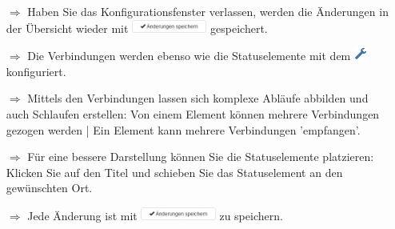 \documentclass{article}
\begin{document}
\begin{multicols}{2}

\begin{tcolorbox}[colback=blue!5,colframe=blue!40!black,title=Workflows konfigurieren 2]
\begin{itemize}
  \item[$\Longrightarrow$] Haben Sie das Konfigurationsfenster verlassen, werden die Änderungen in der Übersicht wieder mit \includegraphics[height=12pt]{Icons/AenderungenSpeichern.png} gespeichert.
	\item[$\Longrightarrow$] Die Verbindungen werden ebenso wie die Statuselemente mit dem \includegraphics[height=12pt]{Icons/Schraubenschluessel.png} konfiguriert.
  \item[$\Longrightarrow$] Mittels den Verbindungen lassen sich komplexe Abläufe abbilden und auch Schlaufen erstellen: Von einem Element können mehrere Verbindungen gezogen werden | Ein Element kann mehrere Verbindungen 'empfangen'.
  \item[$\Longrightarrow$] Für eine bessere Darstellung können Sie die Statuselemente platzieren: Klicken Sie auf den Titel und schieben Sie das Statuselement an den gewünschten Ort.
  \item[$\Longrightarrow$] Jede Änderung ist mit \includegraphics[height=12pt]{Icons/AenderungenSpeichern.png} zu speichern.

\end{itemize}
\end{tcolorbox}



\end{multicols}
\end{document}
